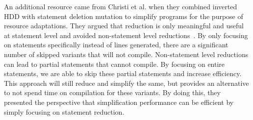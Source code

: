 An additional resource came from Christi et al. when they combined inverted HDD with statement deletion mutation to simplify programs for the purpose of resource adaptations. They argued that reduction is only meaningful and useful at statement level and avoided non-statement level reductions~\cite{christi2017saso, christi2018qrs}. By only focusing on statements specifically instead of lines generated, there are a significant number of skipped variants that will not compile. Non-statement level reductions can lead to partial statements that cannot compile. By focusing on entire statements, we are able to skip these partial statements and increase efficiency. This approach will still reduce and simplify the same, but provides an alternative to not spend time on compilation for these variants. By doing this, they presented the perspective that simplification performance can be efficient by simply focusing on statement reduction.

